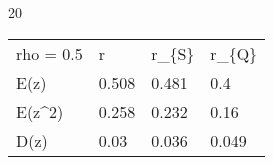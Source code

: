 
20
\begin{tabular}{llll}
\hline
 rho = 0.5 & r     & r\_\{S\} & r\_\{Q\} \\
 E(z)      & 0.508 & 0.481 & 0.4   \\
 E(z\^{}2)    & 0.258 & 0.232 & 0.16  \\
 D(z)      & 0.03  & 0.036 & 0.049 \\
\hline
\end{tabular}